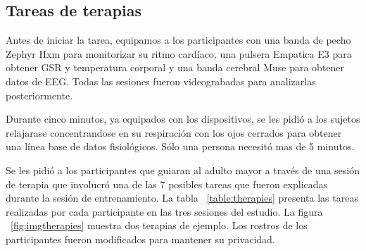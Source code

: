 \subsection{Tareas de terapias}\label{secc:therapytasks}
Antes de iniciar la tarea, equipamos a los participantes con una banda de pecho Zephyr Hxm para monitorizar su ritmo card\'iaco, una pulsera Empatica E3 para obtener GSR y temperatura corporal y una banda cerebral Muse para obtener datos de EEG. Todas las sesiones fueron videograbadas para analizarlas posteriormente.

Durante cinco minutos, ya equipados con los dispositivos, se les pidi\'o a los sujetos relajarase concentrandose en su respiraci\'on con los ojos cerrados para obtener una l\'inea base de datos fisiol\'ogicos. S\'olo una persona necesit\'o mas de 5 minutos.

Se les pidi\'o a los participantes que guiaran al adulto mayor a trav\'es de una sesi\'on de terapia que involucr\'o una de las 7 posibles tareas que fueron explicadas durante la sesi\'on de entrenamiento. La tabla ~\ref{table:therapies} presenta las tareas realizadas por cada participante en las tres sesiones del estudio. La figura ~\ref{fig:imgtherapies} muestra dos terapias de ejemplo. Los rostros de los participantes fueron modificados para mantener su privacidad.

